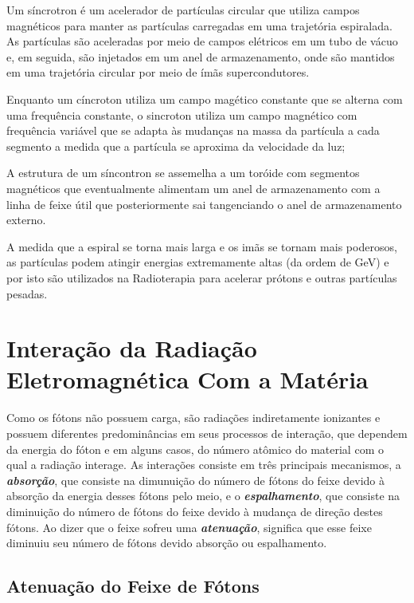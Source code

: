 \documentclass[11pt,a4paper]{article}
\begin{document}
    Um síncrotron é um acelerador de partículas circular que utiliza campos magnéticos para manter as partículas carregadas em uma trajetória espiralada. As partículas são aceleradas por meio de campos elétricos em um tubo de vácuo e, em seguida, são injetados em um anel de armazenamento, onde são mantidos em uma trajetória circular por meio de ímãs supercondutores.

    Enquanto um cíncroton utiliza um campo magético constante que se alterna com uma frequência constante, o sincroton utiliza um campo magnético com frequência variável que se adapta às mudanças na massa da partícula a cada segmento a medida que a partícula se aproxima da velocidade da luz;

    A estrutura de um síncontron se assemelha a um toróide com segmentos magnéticos que eventualmente alimentam um anel de armazenamento com a linha de feixe útil que posteriormente sai tangenciando o anel de armazenamento externo. 

    A medida que a espiral se torna mais larga e os imãs se tornam mais poderosos, as partículas podem atingir energias extremamente altas (da ordem de GeV) e por isto são utilizados na Radioterapia para acelerar prótons e outras partículas pesadas. 
                
\section{Interação da Radiação Eletromagnética Com a Matéria}

    Como os fótons não possuem carga, são radiações indiretamente ionizantes e possuem diferentes predominâncias em seus processos de interação, que dependem da energia do fóton e em alguns casos, do número atômico do material com o qual a radiação interage. As interações consiste em três principais mecanismos, a \textbf{\textit{\textcolor{CarnationPink}{absorção}}}, que consiste na dimunuição do número de fótons do feixe devido à absorção da energia desses fótons pelo meio, e o \textbf{\textit{\textcolor{CarnationPink}{espalhamento}}}, que consiste na diminuição do número de fótons do feixe devido à mudança de direção destes fótons. Ao dizer que o feixe sofreu uma \textbf{\textit{\textcolor{CarnationPink}{atenuação}}}, significa que esse feixe diminuiu seu número de fótons devido absorção ou espalhamento.


\subsection*{Atenuação do Feixe de Fótons}
\end{document}
